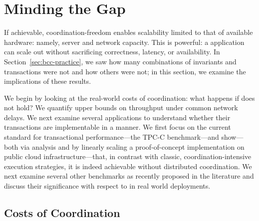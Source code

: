
\section{Minding the Gap}
\label{sec:evaluation}

If achievable, coordination-freedom enables scalability limited to
that of available hardware: namely, server and network capacity. This
is powerful: a \cfree application can scale out without sacrificing
correctness, latency, or availability. In
Section~\ref{sec:bcc-practice}, we saw how many combinations of
invariants and transactions were not \iconfluent and how others were
not; in this section, we examine the implications of these results.

We begin by looking at the real-world costs of coordination: what
happens if \iconfluence does not hold? We quantify upper bounds on
throughput under common network delays. We next examine several
applications to understand whether their transactions are
implementable in a \cfree manner. We first focus on the current
standard for transactional performance---the TPC-C benchmark---and
show---both via \iconfluence analysis and by linearly scaling a
proof-of-concept implementation on public cloud infrastructure---that,
in contrast with classic, coordination-intensive execution strategies,
it is indeed achievable without distributed coordination. We next
examine several other benchmarks as recently proposed in the
literature and discuss their significance with respect to \cfreedom in
real world deployments.

\subsection{Costs of Coordination}

